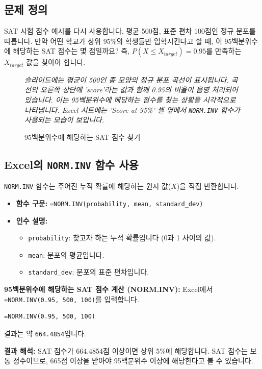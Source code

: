 \documentclass[11pt,a4paper]{book}
\theoremstyle{definition}
\begin{document}
\subsection{문제 정의}
SAT 시험 점수 예시를 다시 사용합니다. 평균 500점, 표준 편차 100점인 정규 분포를 따릅니다.
만약 어떤 학교가 상위 95\%의 학생들만 입학시킨다고 할 때, 이 95백분위수에 해당하는 SAT 점수는 몇 점일까요?
즉, $P(X \le X_{target}) = 0.95$를 만족하는 $X_{target}$ 값을 찾아야 합니다.

\begin{figure}[h!]
    \centering
    \caption{95백분위수에 해당하는 SAT 점수 찾기}
    \label{fig:sat_inv_function}
    \vspace{0.5em}
    \textit{슬라이드에는 평균이 500인 종 모양의 정규 분포 곡선이 표시됩니다. 곡선의 오른쪽 상단에 'score'라는 값과 함께 0.95의 비율이 음영 처리되어 있습니다. 이는 95백분위수에 해당하는 점수를 찾는 상황을 시각적으로 나타냅니다. Excel 시트에는 'Score at 95\%' 셀 옆에서 \texttt{NORM.INV} 함수가 사용되는 모습이 보입니다.}
\end{figure}

\subsection{Excel의 \texttt{NORM.INV} 함수 사용}
\texttt{NORM.INV} 함수는 주어진 누적 확률에 해당하는 원시 값($X$)을 직접 반환합니다.

\begin{itemize}
    \item \textbf{함수 구문:} \texttt{=NORM.INV(probability, mean, standard\_dev)}
    \item \textbf{인수 설명:}
    \begin{itemize}
        \item \texttt{probability}: 찾고자 하는 누적 확률입니다 (0과 1 사이의 값).
        \item \texttt{mean}: 분포의 평균입니다.
        \item \texttt{standard\_dev}: 분포의 표준 편차입니다.
    \end{itemize}
\end{itemize}

\begin{examplebox}
    \textbf{95백분위수에 해당하는 SAT 점수 계산 (NORM.INV):}
    Excel에서 \texttt{=NORM.INV(0.95, 500, 100)}를 입력합니다.
    \begin{lstlisting}[language=Excel, caption={Excel에서 NORM.INV 함수 사용 예시}, label={lst:norm_inv_example}]
=NORM.INV(0.95, 500, 100)
    \end{lstlisting}
    결과는 약 \texttt{664.4854}입니다.

    \textbf{결과 해석:}
    SAT 점수가 664.4854점 이상이면 상위 5\%에 해당합니다.
    SAT 점수는 보통 정수이므로, 665점 이상을 받아야 95백분위수 이상에 해당한다고 볼 수 있습니다.
\end{examplebox}
\end{document}
